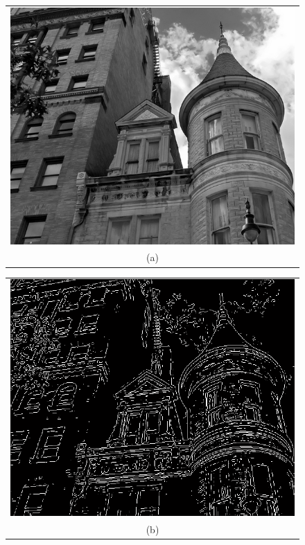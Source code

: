 \begin{figure}[h!]
\centering
\begin{minipage}{.45\textwidth}
\begin{tabular}{c}
\includegraphics[width=.9\textwidth]{segmentation/Building} \\
(a)
\end{tabular}
\end{minipage}
\begin{minipage}{.45\textwidth}
\begin{tabular}{c}
\includegraphics[width=.9\textwidth]{segmentation/LoG} \\
(b)
\end{tabular}
\end{minipage}

\end{figure}
